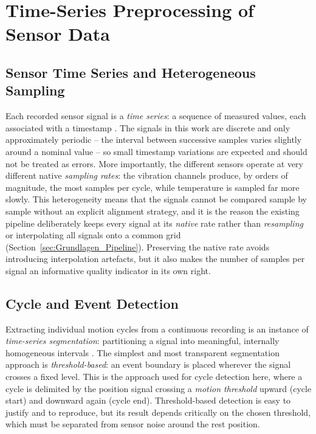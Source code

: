 \section{Time-Series Preprocessing of Sensor Data}
\label{sec:Grundlagen_TS}

\subsection{Sensor Time Series and Heterogeneous Sampling}
\label{subsec:Grundlagen_TS_Abtastung}

Each recorded sensor signal is a \emph{time series}: a sequence of measured values, each
associated with a timestamp \parencite{aigner_visualization_2023}. The signals in this work
are discrete and only approximately periodic -- the interval between successive samples
varies slightly around a nominal value -- so small timestamp variations are expected and
should not be treated as errors. More importantly, the different sensors operate at very
different native \emph{sampling rates}: the vibration channels produce, by orders of
magnitude, the most samples per cycle, while temperature is sampled far more slowly. This
heterogeneity means that the signals cannot be compared sample by sample without an
explicit alignment strategy, and it is the reason the existing pipeline deliberately keeps
every signal at its \emph{native} rate rather than \emph{resampling} or interpolating all
signals onto a common grid (Section~\ref{sec:Grundlagen_Pipeline}). Preserving the native
rate avoids introducing interpolation artefacts, but it also makes the number of samples
per signal an informative quality indicator in its own right.

\subsection{Cycle and Event Detection}
\label{subsec:Grundlagen_TS_Zyklen}

Extracting individual motion cycles from a continuous recording is an instance of
\emph{time-series segmentation}: partitioning a signal into meaningful, internally
homogeneous intervals \parencite{TODO-time-series-segmentation}. The simplest and most
transparent segmentation approach is \emph{threshold-based}: an event boundary is placed
wherever the signal crosses a fixed level. This is the approach used for cycle detection
here, where a cycle is delimited by the position signal crossing a \emph{motion threshold}
upward (cycle start) and downward again (cycle end). Threshold-based detection is easy to
justify and to reproduce, but its result depends critically on the chosen threshold, which
must be separated from sensor noise around the rest position.

